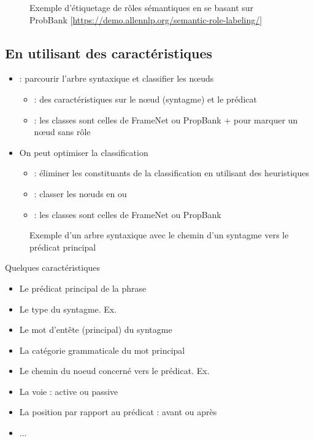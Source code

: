 \documentclass{KodeBook}
\begin{document}
\begin{figure}
	\caption{Exemple d'étiquetage de rôles sémantiques en se basant sur ProbBank [\url{https://demo.allennlp.org/semantic-role-labeling/}]}
\end{figure}

\subsection{En utilisant des caractéristiques}

\begin{itemize}
	\item {} : parcourir l'arbre syntaxique et classifier les nœuds
	\begin{itemize}
		\item {} : des caractéristiques sur le nœud (syntagme) et le prédicat 
		\item {} : les classes sont celles de FrameNet ou PropBank +  pour marquer un nœud sans rôle 
	\end{itemize} 
	\item On peut optimiser la classification
	\begin{itemize}
		\item {} : éliminer les constituants de la classification en utilisant des heuristiques
		\item {} : classer les nœuds en  ou 
		\item {} : les classes sont celles de FrameNet ou PropBank
	\end{itemize} 
\end{itemize}

\begin{figure}
	\caption{Exemple d'un arbre syntaxique avec le chemin d'un syntagme vers le prédicat principal \cite{2019-jurafsky-martin}}
\end{figure}

Quelques caractéristiques
\begin{itemize}
	\item Le prédicat principal de la phrase
	\item Le type du syntagme. Ex. 
	\item Le mot d'entête (principal) du syntagme
	\item La catégorie grammaticale du mot principal 
	\item Le chemin du noeud concerné vers le prédicat. Ex. 
	\item La voie : active ou passive
	\item La position par rapport au prédicat : avant ou après
	\item ...
\end{itemize}
\end{document}
